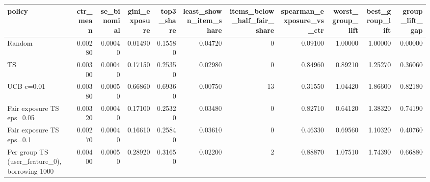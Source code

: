 \begin{tabular}{lrrrrrrrrrr}
\toprule
policy & ctr\_mean & se\_binomial & gini\_exposure & top3\_share & least\_shown\_item\_share & items\_below\_half\_fair\_share & spearman\_exposure\_vs\_ctr & worst\_group\_lift & best\_group\_lift & group\_lift\_gap \\
\midrule
Random & 0.00280 & 0.00040 & 0.01490 & 0.15580 & 0.04720 & 0 & 0.09100 & 1.00000 & 1.00000 & 0.00000 \\
TS & 0.00300 & 0.00040 & 0.17150 & 0.25350 & 0.02980 & 0 & 0.84960 & 0.89210 & 1.25270 & 0.36060 \\
UCB c=0.01 & 0.00380 & 0.00050 & 0.66860 & 0.69360 & 0.00750 & 13 & 0.31550 & 1.04420 & 1.86600 & 0.82180 \\
Fair exposure TS eps=0.05 & 0.00320 & 0.00040 & 0.17100 & 0.25320 & 0.03480 & 0 & 0.82710 & 0.64120 & 1.38320 & 0.74190 \\
Fair exposure TS eps=0.1 & 0.00270 & 0.00040 & 0.16610 & 0.25840 & 0.03610 & 0 & 0.46330 & 0.69560 & 1.10320 & 0.40760 \\
Per group TS (user\_feature\_0), borrowing 1000 & 0.00400 & 0.00050 & 0.28920 & 0.31650 & 0.02200 & 2 & 0.88870 & 1.07510 & 1.74390 & 0.66880 \\
\bottomrule
\end{tabular}
